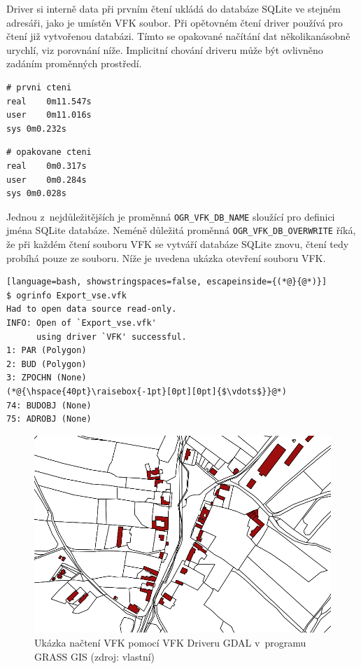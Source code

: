\documentclass[a4paper,12pt,oneside]{book}
\begin{document}
Driver si interně data při prvním čtení ukládá do databáze SQLite ve stejném adresáři, jako je umístěn VFK soubor. Při opětovném čtení driver používá pro čtení již vytvořenou databázi. Tímto se opakované načítání dat několikanásobně urychlí, viz porovnání níže. Implicitní chování driveru může být ovlivněno zadáním proměnných prostředí.

\begin{multicols}{2}
\begin{lstlisting}
# prvni cteni
real	0m11.547s
user	0m11.016s
sys	0m0.232s
\end{lstlisting}
\columnbreak
\begin{lstlisting}
# opakovane cteni
real	0m0.317s
user	0m0.284s
sys	0m0.028s
\end{lstlisting}
\end{multicols}

Jednou z~nejdůležitějších je proměnná \texttt{OGR\_VFK\_DB\_NAME} sloužící pro definici jména SQLite databáze. Neméně důležitá proměnná
\texttt{OGR\_VFK\_DB\_OVERWRITE} říká, že při každém čtení souboru VFK se vytváří databáze SQLite znovu, čtení tedy probíhá pouze ze souboru. Níže je uvedena ukázka otevření souboru VFK. \cite{gdal_vfk}

\begin{lstlisting}[language=bash, showstringspaces=false, escapeinside={(*@}{@*)}]
$ ogrinfo Export_vse.vfk
Had to open data source read-only.
INFO: Open of `Export_vse.vfk'
      using driver `VFK' successful.
1: PAR (Polygon)
2: BUD (Polygon)
3: ZPOCHN (None)
(*@{\hspace{40pt}\raisebox{-1pt}[0pt][0pt]{$\vdots$}}@*)
74: BUDOBJ (None)
75: ADROBJ (None) 
\end{lstlisting}

\begin{figure}[htbp]
\centering
\includegraphics[width=\textwidth]{images/grass_ukazka.png}
\caption[Ukázka načtení VFK pomocí VFK Driveru GDAL v~programu GRASS GIS]{Ukázka načtení VFK pomocí VFK Driveru GDAL v~programu GRASS GIS (zdroj: vlastní)}
\end{figure}
\end{document}
